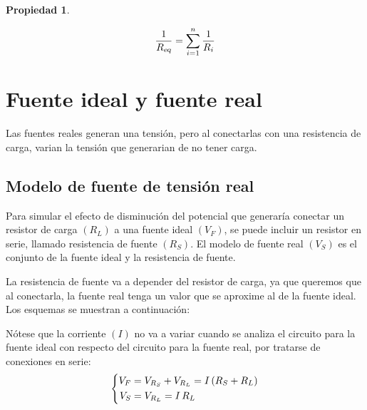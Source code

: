 \documentclass[a5paper,12pt,twoside]{book}
\newtheorem{prop}{{Propiedad}}[chapter]
\begin{document}
\begin{mdframed}[style=MyFrame1]
    \begin{prop}
    \end{prop}
    \begin{equation*}
        \frac{1}{{{R}_\textsl{{eq}}}} = \sum_{i=1}^n \frac{1}{R_i}
    \end{equation*}
\end{mdframed}


\section{Fuente ideal y fuente real}

Las fuentes reales generan una tensión, pero al conectarlas con una resistencia de carga, varian la tensión que generarian de no tener carga.


\subsection{Modelo de fuente de tensión real}

Para simular el efecto de disminución del potencial que generaría conectar un resistor de carga $(R_L)$ a una fuente ideal $(V_F)$, se puede incluir un resistor en serie, llamado resistencia de fuente $(R_S)$.
El modelo de fuente real $(V_S)$ es el conjunto de la fuente ideal y la resistencia de fuente.

La resistencia de fuente va a depender del resistor de carga, ya que queremos que al conectarla, la fuente real tenga un valor que se aproxime al de la fuente ideal.
Los esquemas se muestran a continuación:

\begin{multicols}{2}
    \begin{center}
        \def\svgwidth{0.9\linewidth}
        
    \end{center}
    \begin{center}
        \def\svgwidth{0.9\linewidth}
        
    \end{center}
\end{multicols}

Nótese que la corriente $(I)$ no va a variar cuando se analiza el circuito para la fuente ideal con respecto del circuito para la fuente real, por tratarse de conexiones en serie:
\begin{equation*}
    \left\{
    \begin{aligned}
        V_F &= V_{R_S} + V_{R_L} = I \left(R_S + R_L\right)
        \\
        V_S &= V_{R_L} = I \, R_L
    \end{aligned}
    \right.
\end{equation*}
\end{document}

